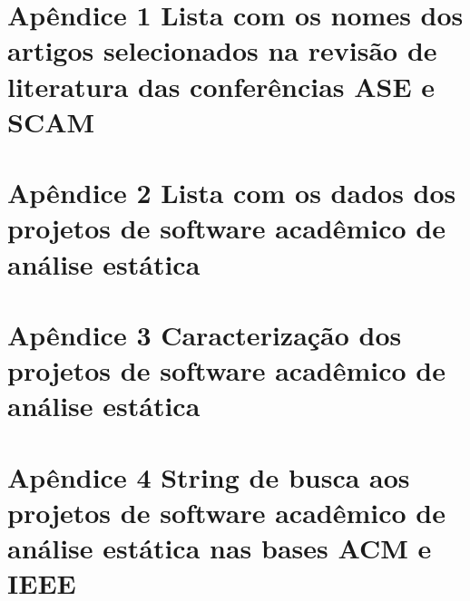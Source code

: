 \documentclass{article}
\begin{document}
\section{Apêndice 1 Lista com os nomes dos artigos selecionados na revisão de literatura das conferências ASE e SCAM}



\section{Apêndice 2 Lista com os dados dos projetos de software acadêmico de análise estática}



\section{Apêndice 3 Caracterização dos projetos de software acadêmico de análise estática}



\section{Apêndice 4 String de busca aos projetos de software acadêmico de análise estática nas bases ACM e IEEE}


\end{document}

